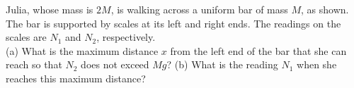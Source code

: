 Julia, whose mass is $2M$, is walking across a uniform bar of mass $M$,
as shown. The bar is supported by scales at its left and right
ends. The readings on the scales are $N_1$ and $N_2$,
respectively.\\
%
(a) What is the maximum distance $x$ from the left end of the bar
that she can reach so that $N_2$ does not exceed $Mg$?\answercheck\hwendpart
%
(b) What is the reading $N_1$ when she reaches this maximum distance?\answercheck
